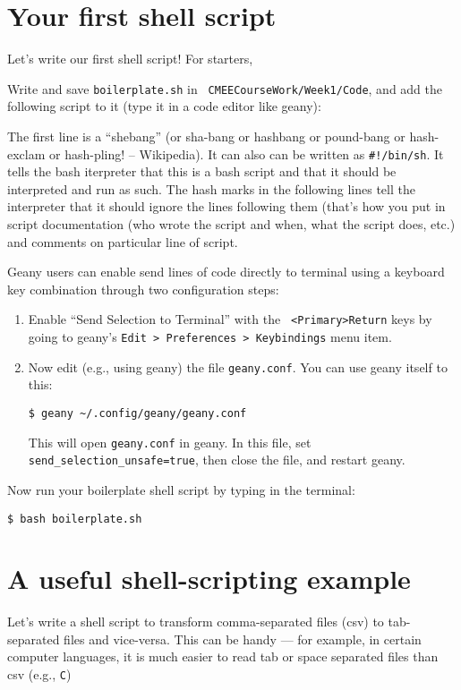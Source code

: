 \section{Your first shell script}

Let's write our first shell script! For starters,
 \begin{compactitem}[$\quad\star$]\itemsep4pt{}
	\item Write and save {\tt boilerplate.sh} in {\tt 
	CMEECourseWork/Week1/Code}, and add the following script to it (type 
	it in a code editor like geany):
	\end{compactitem}
		
	
The first line is a ``shebang'' (or sha-bang or hashbang or pound-bang 
or hash-exclam or hash-pling! -- Wikipedia). It can also can be written 
as {\tt \#!/bin/sh}. It tells the bash iterpreter that this is a bash 
script and that it should be interpreted and run as such. The hash 
marks in the following lines tell the interpreter that it should ignore 
the lines following them (that's how you put in script documentation 
(who wrote the script and when, what the script does, etc.) and 
comments on particular line of script.
\begin{tipbox}
	Geany users can enable send lines of code directly to terminal using a 
	keyboard key combination through two configuration steps: 
	\begin{enumerate}
		\item Enable ``Send Selection to Terminal''	with the {\tt 
		<Primary>Return} keys by going to geany's {\tt Edit > Preferences > 
		Keybindings} menu item. 
		\item Now edit (e.g., using geany) the file {\tt geany.conf}. You 
		can use geany itself to this:
\begin{lstlisting}
$ geany ~/.config/geany/geany.conf
\end{lstlisting}
		This will open {\tt geany.conf} in geany. In this file, set {\tt 
		send\_selection\_unsafe=true}, then close the file, and restart 
		geany. 
	\end{enumerate} 
\end{tipbox}

Now run your boilerplate shell script by typing in the terminal:
\begin{lstlisting}
$ bash boilerplate.sh
\end{lstlisting}

\section{A useful shell-scripting example}
Let's write a shell script to transform comma-separated files (csv) to 
tab-separated files and vice-versa. This can be handy --- for example, 
in certain computer languages, it is much easier to read tab or space 
separated files than csv (e.g., {\tt C})

